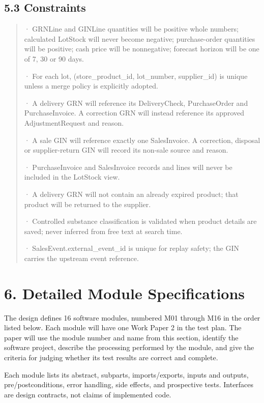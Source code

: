 \subsection{5.3 Constraints}\label{constraints}

\begin{quote}
· GRNLine and GINLine quantities will be positive whole numbers; calculated LotStock will never become negative; purchase-order quantities will be positive; cash price will be nonnegative; forecast horizon will be one of 7, 30 or 90 days.

· For each lot, (store\_product\_id, lot\_number, supplier\_id) is unique unless a merge policy is explicitly adopted.

· A delivery GRN will reference its DeliveryCheck, PurchaseOrder and PurchaseInvoice. A correction GRN will instead reference its approved AdjustmentRequest and reason.

· A sale GIN will reference exactly one SalesInvoice. A correction, disposal or supplier-return GIN will record its non-sale source and reason.

· PurchaseInvoice and SalesInvoice records and lines will never be included in the LotStock view.

· A delivery GRN will not contain an already expired product; that product will be returned to the supplier.

· Controlled substance classification is validated when product details are saved; never inferred from free text at search time.

· SalesEvent.external\_event\_id is unique for replay safety; the GIN carries the upstream event reference.
\end{quote}

\clearpage
\section{6. Detailed Module Specifications}\label{detailed-module-specifications}

The design defines 16 software modules, numbered M01 through M16 in the order listed below. Each module will have one Work Paper 2 in the test plan. The paper will use the module number and name from this section, identify the software project, describe the processing performed by the module, and give the criteria for judging whether its test results are correct and complete.

Each module lists its abstract, subparts, imports/exports, inputs and outputs, pre/postconditions, error handling, side effects, and prospective tests. Interfaces are design contracts, not claims of implemented code.

